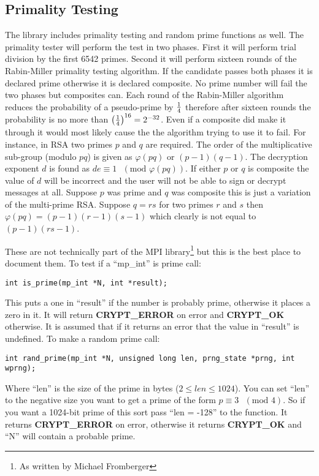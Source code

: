 \documentclass{book}
\def\phi{\varphi}
\begin{document}
\subsection{Primality Testing}
The library includes primality testing and random prime functions as well.  The primality tester will perform the test in
two phases.  First it will perform trial division by the first 6542 primes.  Second it will perform sixteen rounds of the 
Rabin-Miller primality testing algorithm.  If the candidate passes both phases it is declared prime otherwise it is declared
composite.  No prime number will fail the two phases but composites can.  Each round of the Rabin-Miller algorithm reduces
the probability of a pseudo-prime by $1 \over 4$ therefore after sixteen rounds the probability is no more than 
$\left ( { 1 \over 4 } \right )^{16} = 2^{-32}$.  Even if a composite did make it through it would most likely cause the 
the algorithm trying to use it to fail.  For instance, in RSA two primes $p$ and $q$ are required.  The order of the 
multiplicative sub-group (modulo $pq$) is given as $\phi(pq)$ or $(p - 1)(q - 1)$.  The decryption exponent $d$ is found
as $de \equiv 1\mbox{ }(\mbox{mod } \phi(pq))$.  If either $p$ or $q$ is composite the value of $d$ will be incorrect and the user
will not be able to sign or decrypt messages at all.  Suppose $p$ was prime and $q$ was composite this is just a variation of 
the multi-prime RSA.  Suppose $q = rs$ for two primes $r$ and $s$ then $\phi(pq) = (p - 1)(r - 1)(s - 1)$ which clearly is 
not equal to $(p - 1)(rs - 1)$.

These are not technically part of the MPI
library\footnote{As written by Michael Fromberger} but this is the best place to document them.  To test if a ``mp\_int'' is
prime call:
\begin{verbatim}
int is_prime(mp_int *N, int *result);
\end{verbatim}
This puts a one in ``result'' if the number is probably prime, otherwise it places a zero in it.  It will return {\bf CRYPT\_ERROR} on error
and {\bf CRYPT\_OK} otherwise.  It is assumed that if it returns an error that the value in ``result'' is undefined.  To make 
a random prime call:
\begin{verbatim}
int rand_prime(mp_int *N, unsigned long len, prng_state *prng, int wprng);
\end{verbatim}
Where ``len'' is the size of the prime in bytes ($2 \le len \le 1024$).  You can set ``len'' to the negative size you want
to get a prime of the form $p \equiv 3\mbox{ }(\mbox{mod } 4)$.  So if you want a 1024-bit prime of this sort pass 
``len = -128'' to the function.  It returns {\bf CRYPT\_ERROR} on error, otherwise it returns {\bf CRYPT\_OK} and ``N'' will
contain a probable prime.
\end{document}
